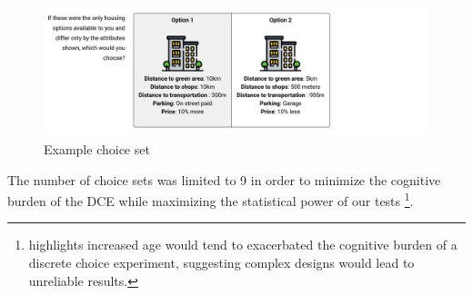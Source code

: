 \documentclass[3p,11pt ]{elsarticle}
\begin{document}
\begin{figure}[H]
\centering
\includegraphics[scale=0.20]{figures/choice_set.png}
\caption{Example choice set \label{fig:choice_set}}
\end{figure}

The number of choice sets was limited to 9 in order to minimize the cognitive burden of the DCE while maximizing the statistical power of our tests \citep{manghamHowNotDesigning2009,deshazoDesigningChoiceSets2002}
\footnote{\cite{himmlerWhatWorksBetter2021} highlights increased age would tend to exacerbated the cognitive burden of a discrete choice experiment, suggesting complex designs would lead to unreliable results.}.









%
%
%

\end{document}
